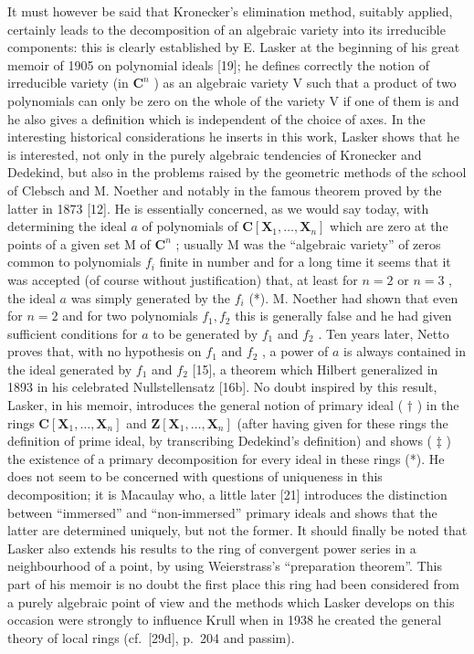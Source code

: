 It must however be said that Kronecker's elimination method, suitably applied, certainly leads to the decomposition of an algebraic variety into its irreducible components: this is clearly established by E. Lasker at the beginning of his great memoir of 1905 on polynomial ideals {[}19{]}; he defines correctly the notion of irreducible variety (in \(\mathbf{C}^n\) ) as an algebraic variety V such that a product of two polynomials can only be zero on the whole of the variety V if one of them is and he also gives a definition which is independent of the choice of axes. In the interesting historical considerations he inserts in this work, Lasker shows that he is interested, not only in the purely algebraic tendencies of Kronecker and Dedekind, but also in the problems raised by the geometric methods of the school of Clebsch and M. Noether and notably in the famous theorem proved by the latter in 1873 {[}12{]}. He is essentially concerned, as we would say today, with determining the ideal \(a\) of polynomials of \(\mathbf{C}[\mathbf{X}_1,\ldots ,\mathbf{X}_n]\) which are zero at the points of a given set M of \(\mathbf{C}^n\) ; usually M was the ``algebraic variety'' of zeros common to polynomials \(f_{i}\) finite in number and for a long time it seems that it was accepted (of course without justification) that, at least for \(n = 2\) or \(n = 3\) , the ideal \(a\) was simply generated by the \(f_{i}\) (*). M. Noether had shown that even for \(n = 2\) and for two polynomials \(f_{1},f_{2}\) this is generally false and he had given sufficient conditions for \(a\) to be generated by \(f_{1}\) and \(f_{2}\) . Ten years later, Netto proves that, with no hypothesis on \(f_{1}\) and \(f_{2}\) , a power of \(a\) is always contained in the ideal generated by \(f_{1}\) and \(f_{2}\) {[}15{]}, a theorem which Hilbert generalized in 1893 in his celebrated Nullstellensatz {[}16b{]}. No doubt inspired by this result, Lasker, in his memoir, introduces the general notion of primary ideal ( \(\dagger\) ) in the rings \(\mathbf{C}[\mathbf{X}_1,\dots ,\mathbf{X}_n]\) and \(\mathbf{Z}[\mathbf{X}_1,\dots ,\mathbf{X}_n]\) (after having given for these rings the definition of prime ideal, by transcribing Dedekind's definition) and shows ( \(\ddagger\) ) the existence of a primary decomposition for every ideal in these rings (*). He does not seem to be concerned with questions of uniqueness in this decomposition; it is Macaulay who, a little later {[}21{]} introduces the distinction between ``immersed'' and ``non-immersed'' primary ideals and shows that the latter are determined uniquely, but not the former. It should finally be noted that Lasker also extends his results to the ring of convergent power series in a neighbourhood of a point, by using Weierstrass's ``preparation theorem''. This part of his memoir is no doubt the first place this ring had been considered from a purely algebraic point of view and the methods which Lasker develops on this occasion were strongly to influence Krull when in 1938 he created the general theory of local rings (cf.~{[}29d{]}, p.~204 and passim).

